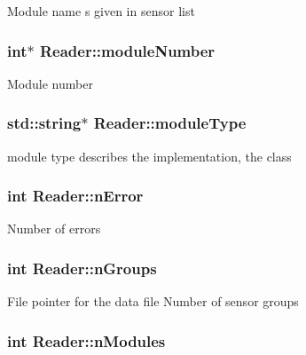 Module name s given in sensor list \hypertarget{classReader_aa816d9ed493e53da3119680a60a581ed}{
\subsubsection[{module\-Number}]{\setlength{\rightskip}{0pt plus 5cm}int$\ast$ Reader\-::module\-Number\hspace{0.3cm}{\ttfamily [private]}}}\label{classReader_aa816d9ed493e53da3119680a60a581ed}
Module number \hypertarget{classReader_a082c78fbd3e67423e6ab134d4fb61cc9}{
\subsubsection[{module\-Type}]{\setlength{\rightskip}{0pt plus 5cm}std\-::string$\ast$ Reader\-::module\-Type\hspace{0.3cm}{\ttfamily [private]}}}\label{classReader_a082c78fbd3e67423e6ab134d4fb61cc9}
module type describes the implementation, the class \hypertarget{classReader_a5d275c3577f7d7c02a6cc83f70d0dcc7}{
\subsubsection[{n\-Error}]{\setlength{\rightskip}{0pt plus 5cm}int Reader\-::n\-Error\hspace{0.3cm}{\ttfamily [private]}}}\label{classReader_a5d275c3577f7d7c02a6cc83f70d0dcc7}
Number of errors \hypertarget{classReader_aa87a2b5443237f58cadeaa815e6e6790}{
\subsubsection[{n\-Groups}]{\setlength{\rightskip}{0pt plus 5cm}int Reader\-::n\-Groups\hspace{0.3cm}{\ttfamily [private]}}}\label{classReader_aa87a2b5443237f58cadeaa815e6e6790}
File pointer for the data file Number of sensor groups \hypertarget{classReader_abf76426a02d8896908e76edefa1821b2}{
\subsubsection[{n\-Modules}]{\setlength{\rightskip}{0pt plus 5cm}int Reader\-::n\-Modules\hspace{0.3cm}{\ttfamily [private]}}}\label{classReader_abf76426a02d8896908e76edefa1821b2}
